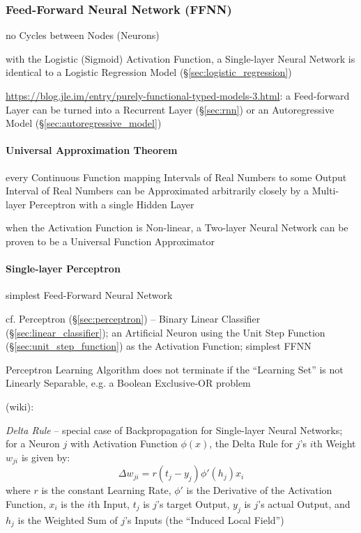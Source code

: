 \subsubsection{Feed-Forward Neural Network (FFNN)}\label{sec:ffnn}

no Cycles between Nodes (Neurons)

with the Logistic (Sigmoid) Activation Function, a Single-layer Neural Network
is identical to a Logistic Regression Model (\S\ref{sec:logistic_regression})

\url{https://blog.jle.im/entry/purely-functional-typed-models-3.html}: a
Feed-forward Layer can be turned into a Recurrent Layer (\S\ref{sec:rnn}) or an
Autoregressive Model (\S\ref{sec:autoregressive_model})



\paragraph{Universal Approximation Theorem}
\label{sec:universal_approximation}\hfill

every Continuous Function mapping Intervals of Real Numbers to some Output
Interval of Real Numbers can be Approximated arbitrarily closely by a
Multi-layer Perceptron with a single Hidden Layer

when the Activation Function is Non-linear, a Two-layer Neural Network can be
proven to be a Universal Function Approximator



\paragraph{Single-layer Perceptron}\label{sec:single_layer_perceptron}\hfill

simplest Feed-Forward Neural Network

cf. Perceptron (\S\ref{sec:perceptron}) -- Binary Linear Classifier
(\S\ref{sec:linear_classifier}); an Artificial Neuron using the Unit Step
Function (\S\ref{sec:unit_step_function}) as the Activation Function; simplest
FFNN

Perceptron Learning Algorithm does not terminate if the ``Learning Set'' is not
Linearly Separable, e.g. a Boolean Exclusive-OR problem

(wiki):

\emph{Delta Rule} -- special case of Backpropagation for Single-layer Neural
Networks; for a Neuron $j$ with Activation Function $\phi(x)$, the Delta Rule
for $j$'s $i$th Weight $w_{ji}$ is given by:
\[
  \Delta w_{ji} = r(t_j - y_j) \phi'(h_j) x_i
\]
where $r$ is the constant Learning Rate, $\phi'$ is the Derivative of the
Activation Function, $x_i$ is the $i$th Input, $t_j$ is $j$'s target Output,
$y_j$ is $j$'s actual Output, and $h_j$ is the Weighted Sum of $j$'s Inputs (the
``Induced Local Field'')



